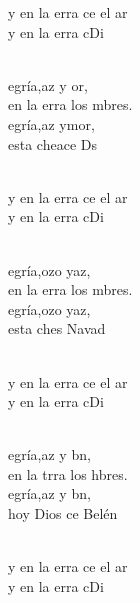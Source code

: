\documentclass[12pt]{article}
\begin{document}
\begin{multicols*}{2}
\begin{cancion}%
	\begin{chorus}%
	y en la erra ce el ar\\
	y en la erra cDi\\
	\end{chorus}%
	\jump\\
	egría,az y or, \\
	en la erra los mbres.\\
	egría,az ymor, \\
	esta cheace Ds\\\jump\\
	\begin{chorus}%
	y en la erra ce el ar\\
	y en la erra cDi\\
	\end{chorus}%
	\jump\\
	egría,ozo yaz,\\
	en la erra los mbres.\\
	egría,ozo yaz,\\
	esta ches Navad\\\jump\\
	\begin{chorus}%
	y en la erra ce el ar\\
	y en la erra cDi\\
	\end{chorus}%
	\jump\\
	egría,az y bn, \\
	en la trra los hbres.\\
	egría,az y bn,\\
	hoy Dios ce  Belén\\\jump\\
	\begin{chorus}%
	y en la erra ce el ar\\
	y en la erra cDi\\
	\end{chorus}%
	\jump\\
\end{cancion}%


\end{multicols*}
\end{document}
